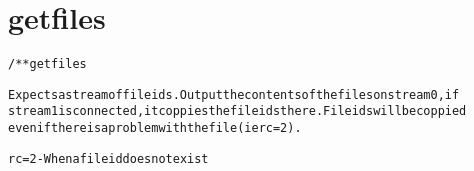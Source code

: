 \section{getfiles}
\begin{shaded}
\begin{alltt}
/** getfiles

Expects a stream of fileids.  Output the contents of the files on stream 0, if
stream 1 is connected, it coppies the fileids there.  Fileids will be coppied
even if there is a problem with the file (ie rc=2).

rc = 2  - When a fileid does not exist

\end{alltt}
\end{shaded}
